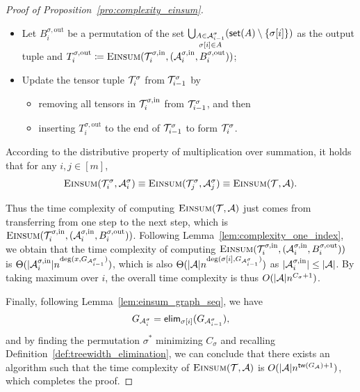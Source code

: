 \documentclass[letterpaper,11pt]{article}
\newcommand{\takesetp}[1]{\mathsf{set}(#1)}
\newcommand{\tensorcontraction}{\textsc{Einsum}}
\newcommand{\degp}[2]{\deg(#1,#2)}
\newcommand{\treewidthp}[1]{\mathsf{tw}(#1)}
\newcommand{\graphform}[1]{G_{#1}}
\newcommand{\less}{O}
\newcommand{\appequal}{\Theta}
\newcommand{\eliminatevg}[2]{\mathsf{elim}_{#1}(#2)}
\begin{document}
\begin{bibunit}[plainnat]
\begin{proof}[Proof of Proposition~\ref{pro:complexity_einsum}]
\begin{itemize}
    \item Let $B^{\sigma, \mathrm{out}}_i$ be a permutation of the set $\bigcup_{\substack{A \in \calA^{\sigma}_{i-1} \\ \sigma[i] \in A}} (\takesetp{A} \setminus \{\sigma[i]\})$ as the output tuple and $T^{\sigma, \mathrm{out}}_i \coloneqq \tensorcontraction(\calT^{\sigma, \mathrm{in}}_i, (\calA^{\sigma, \mathrm{in}}_i, B^{\sigma, \mathrm{out}}_i))$;
    
    \item Update the tensor tuple ${\mathcal{T}}^{\sigma}_i$ from ${\mathcal{T}}^{\sigma}_{i-1}$ by
    \begin{itemize}
        \item removing all tensors in ${\mathcal{T}}^{\sigma, \mathrm{in}}_i$ from ${\mathcal{T}}^{\sigma}_{i-1}$, and then
        \item inserting $T^{\sigma, \mathrm{out}}_i$ to the end of ${\mathcal{T}}^{\sigma}_{i-1}$ to form ${\mathcal{T}}^{\sigma}_{i}$.
    \end{itemize}
\end{itemize}

According to the distributive property of multiplication over summation, it holds that for any $i,j \in [m]$, 
\begin{align*}
\tensorcontraction(\calT^\sigma_i, \calA^\sigma_i) \equiv  \tensorcontraction(\calT^\sigma_j, \calA^\sigma_j) \equiv \tensorcontraction(\calT, \calA).
\end{align*}

Thus the time complexity of computing $\tensorcontraction(\calT, \calA)$ just comes from transferring from one step to the next step, which is $\tensorcontraction(\calT^{\sigma, \mathrm{in}}_i, (\calA^{\sigma, \mathrm{in}}_i, B^{\sigma, \mathrm{out}}_i))$. Following Lemma~\ref{lem:complexity_one_index}, we obtain that the time complexity of computing $\tensorcontraction(\calT^{\sigma, \mathrm{in}}_i, (\calA^{\sigma, \mathrm{in}}_i, B^{\sigma, \mathrm{out}}_i))$ is $\appequal(|\calA^{\sigma, \mathrm{in}}_i| n^{\degp{x}{\graphform{\calA^{\sigma}_{i-1}}}})$, which is also $\appequal(|\calA|n^{\degp{\sigma[i]}{\graphform{\calA^{\sigma}_{i-1}}}})$ as $|{\mathcal{A}}^{\sigma, \mathrm{in}}_i| \leq |{\mathcal{A}}|$. By taking maximum over $i$, the overall time complexity is thus $\less(|\calA|n^{C_\sigma + 1})$.

Finally, following Lemma~\ref{lem:einsum_graph_seq}, we have
\begin{align*}
\graphform{\calA^{\sigma}_i} = \eliminatevg{\sigma[i]}{\graphform{\calA^{\sigma}_{i-1}}},
\end{align*}
and by finding the permutation $\sigma^{\ast}$ minimizing $ C_{\sigma}$ and recalling Definition~\ref{def:treewidth_elimination}, we can conclude that there exists an algorithm such that the time complexity of $\tensorcontraction(\calT, \calA)$ is $\less(|\calA|n^{\treewidthp{G_\calA}+1})$, which completes the proof. 
\end{proof}


\end{bibunit}
\end{document}
